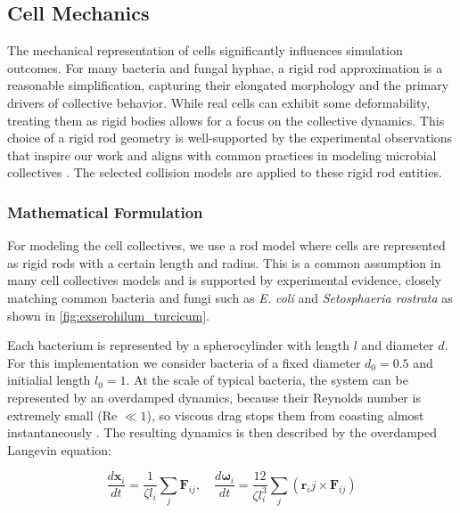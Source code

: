 \documentclass[conference]{IEEEtran}
\begin{document}
\subsection{Cell Mechanics}

The mechanical representation of cells significantly influences simulation outcomes. For many bacteria and fungal hyphae, a rigid rod approximation is a reasonable simplification, capturing their elongated morphology and the primary drivers of collective behavior. While real cells can exhibit some deformability, treating them as rigid bodies allows for a focus on the collective dynamics. This choice of a rigid rod geometry is well-supported by the experimental observations that inspire our work and aligns with common practices in modeling microbial collectives\cite{You2018}\cite{Weady2024}\cite{Blanchard2015}\cite{Warren2019}\cite{Ghosh2015}\cite{Khan_2024}\cite{Rudge2012} . The selected collision models are applied to these rigid rod entities.

\subsubsection{Mathematical Formulation}

For modeling the cell collectives, we use a rod model where cells are represented as rigid rods with a certain length and radius. This is a common assumption in many cell collectives models \cite{You2018}\cite{Weady2024}\cite{Blanchard2015}\cite{Warren2019}\cite{Ghosh2015} and is supported by experimental evidence, closely matching common bacteria and fungi such as \textit{E. coli} and \textit{Setosphaeria rostrata} as shown in \autoref{fig:exserohilum_turcicum}.


Each bacterium is represented by a spherocylinder with length $l$ and diameter $d$. For this implementation we consider bacteria of a fixed diameter $d_0 = 0.5$ and initialial length $l_0 = 1$. At the scale of typical bacteria, the system can be represented by an overdamped dynamics, because their Reynolds number is extremely small (Re $\ll 1$), so viscous drag stops them from coasting almost instantaneously \cite{datta2024lifelowreynoldsnumber}. The resulting dynamics is then described by the overdamped Langevin equation:

$$
    \frac{d \mathbf{x}_i}{dt} = \frac{1}{\zeta l_i} \sum_j \mathbf{F}_{ij}, \quad \frac{d \mathbf{\omega}_i}{dt} = \frac{12}{\zeta l_i^3} \sum_j (\mathbf{r}_ij \times \mathbf{F}_{ij})
$$
\label{eq:overdamped_langevin}
\end{document}
